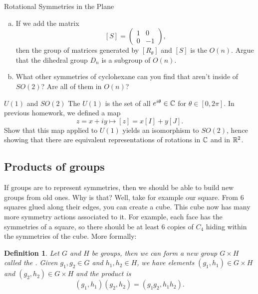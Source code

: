 \documentclass{article}
\theoremstyle{indented}
\newtheorem{definition}{Definition}
\begin{document}
\begin{problem}{Rotational Symmetries in the Plane}
\begin{enumerate}[(a)]
\begin{figure}[H]
    \end{figure}
inside of the group $SO(2)$.
\item If we add the matrix
\[
[S] = \begin{pmatrix} 1 & 0 \\ 0 & -1 \end{pmatrix},
\]
then the group of matrices generated by $[R_\theta]$ and $[S]$ is the  $O(n)$. Argue that the dihedral group $D_n$ is a subgroup of $O(n)$.

\item What other symmetries of cyclohexane can you find that aren't inside of $SO(2)$? Are all of them in $O(n)$?
\end{enumerate}
\end{problem}

\begin{problem}{$U(1)$ and $SO(2)$}{}
The  $U(1)$ is the set of all $e^{i \theta}\in \mathbb{C}$ for $\theta \in [0,2\pi]$. In previous homework, we defined a map
\[
z=x+iy \mapsto [z] = x[I]+y[J].
\]
Show that this map applied to $U(1)$ yields an isomorphism to $SO(2)$, hence showing that there are equivalent representations of rotations in $\mathbb{C}$ and in $\mathbb{R}^2$.
\end{problem}


\subsection{Products of groups}
If groups are to represent symmetries, then we should be able to build new groups from old ones. Why is that? Well, take for example our square. From 6 squares glued along their edges, you can create a cube. This cube now has many more symmetry actions associated to it. For example, each face has the symmetries of a square, so there should be at least 6 copies of $C_4$ hiding within the symmetries of the cube. More formally:

\begin{definition}
Let $G$ and $H$ be groups, then we can form a new group $G\times H$ called the . Given $g_1,g_2 \in G$ and $h_1,h_2\in H$, we have elements $(g_1,h_1) \in G\times H$ and $(g_2,h_2)\in G\times H$ and the product is
\[
(g_1,h_1)(g_2,h_2) = (g_1g_2,h_1h_2).
\]
\end{definition}
\end{document}
